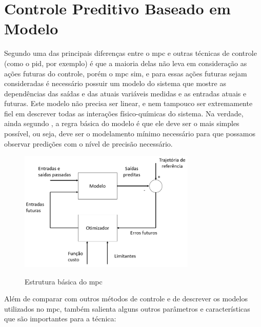 \chapter{Controle Preditivo Baseado em Modelo}
\label{ch:mpc}

Segundo  uma das principais diferenças entre o \acrshort{mpc} e outras
técnicas de controle (como o \acrshort{pid}, por exemplo) é que a maioria delas não leva em consideração
as ações futuras do controle, porém o \acrshort{mpc} sim, e para essas ações futuras sejam consideradas
é necessário possuir um modelo do sistema que mostre as dependências das saídas e das atuais variáveis
medidas e as entradas atuais e futuras. %
Este modelo não precisa ser linear, e nem tampouco ser extremamente fiel em descrever todas as interações
físico-químicas do sistema. Na verdade, ainda segundo , a regra básica do modelo 
é que ele deve ser o mais simples possível, ou seja, deve ser o modelamento mínimo necessário para que
possamos observar predições com o nível de precisão necessário.

\begin{figure}[h]
    \caption{Estrutura básica do \acrshort{mpc}}
	\begin{center}
		\includegraphics[width=0.75\textwidth]{./5_images/fig_mpc_basic_structure.png} 
		\label{fig:mpc_basic_structure}
    \end{center}
    \centering
\end{figure}

Além de comparar com outros métodos de controle e de descrever os modelos utilizados no \acrshort{mpc},
 também salienta alguns outros parâmetros e características que são importantes
para a técnica:

